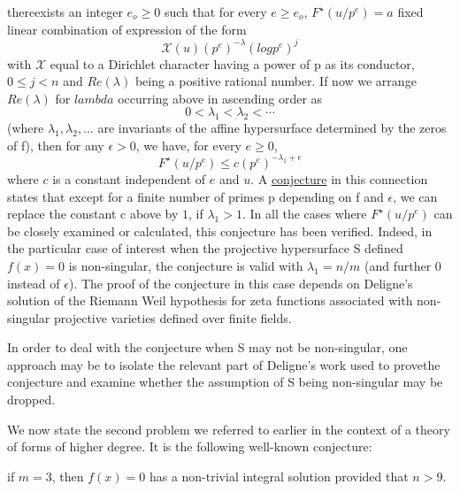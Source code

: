 \noindent there\pageoriginale exists an integer $e_o\ge0$ such that for every $e\ge e_o$,
$F^\star{(u/p^e)}=a$ fixed linear combination of expression of the
form
\begin{equation*}
  \mathcal{X}(u)(p^e)^{-\lambda}(log p^e)^j
\end{equation*}
with $\mathcal{X}$ equal to a Dirichlet character having a power of p
as its condu\-ctor, $0\leq j < n$ and $Re(\lambda)$ being a positive
rational number. 
If now we arrange $Re(\lambda)$ for $lambda$ occurring above in
ascending order as 
\begin{equation*}
  0<\lambda_1<\lambda_2<\cdots
\end{equation*}
(where $\lambda_1,\lambda_2,\ldots$ are invariants of the affine
hypersurface determined by the zeros of f), then for any $\epsilon>0$,
we have, for every $e\geq 0$,
\begin{equation*}
  F^\star(u/p^e)\leq c(p^e)^{-\lambda_1+\epsilon}
\end{equation*}
where $c$ is a constant independent of $e$ and $u$. A \underline{conjecture}
in this connection states that except for a finite number of primes p
depending on f and $\epsilon$, we can replace the constant c above by
$1$, if $\lambda_1 > 1$.
In all the cases where $F^\star(u/p^e)$ can be closely examined or
calculated, this conjecture has been verified. Indeed, in the
particular case of interest when the projective hypersurface S defined
$f(x)=0$ is non-singular, the conjecture is valid with $\lambda_1=n/m$
(and further 0 instead of $\epsilon$). The proof of the conjecture in
this case depends on Deligne's solution of the Riemann Weil hypothesis
for zeta functions associated with non-singular projective varieties
defined over finite fields.

In order to deal with the conjecture when S may not be non-singular,
one approach may be to isolate the relevant part of Deligne's work
used to prove\pageoriginale the conjecture and examine whether the assumption of S
being non-singular may be dropped.

We now state the second problem we referred to earlier in the context
of a theory of forms of higher degree. It is the following well-known
conjecture:

\noindent if $m=3$, then $f(x)=0$ has a non-trivial integral solution provided 
that $n>9$.


